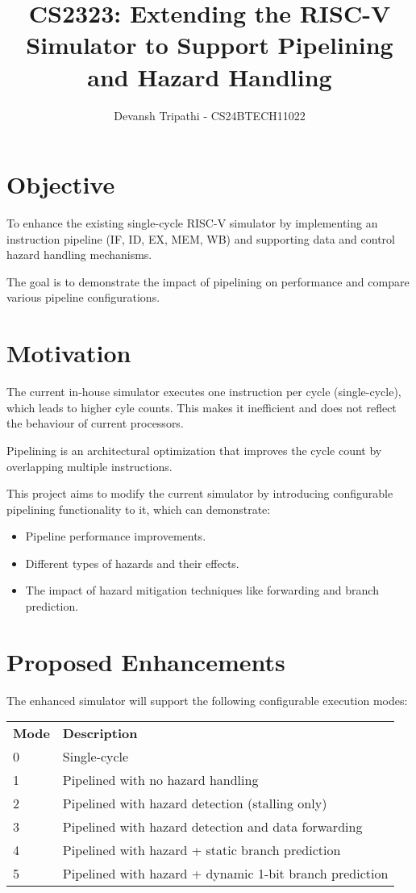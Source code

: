 \documentclass{report}
\author{Devansh Tripathi - CS24BTECH11022}
\title{CS2323: Extending the RISC-V Simulator to Support Pipelining and Hazard Handling}
\date{}
\begin{document}
\maketitle
\newpage
\tableofcontents
\newpage
\section{Objective}
To enhance the existing single-cycle RISC-V simulator by implementing an instruction pipeline (IF, ID, EX, MEM, WB) and supporting data and control hazard handling mechanisms.

The goal is to demonstrate the impact of pipelining on performance and compare various pipeline configurations.

\section{Motivation}
The current in-house simulator executes one instruction per cycle (single-cycle), which leads to higher cyle counts. This makes it inefficient and does not reflect the behaviour of current processors.

Pipelining is an architectural optimization that improves the cycle count by overlapping multiple instructions.

This project aims to modify the current simulator by introducing configurable pipelining functionality to it, which can demonstrate:
\begin{itemize}
    \item Pipeline performance improvements.
    \item Different types of hazards and their effects.
    \item The impact of hazard mitigation techniques like forwarding and branch prediction.
\end{itemize}

\section{Proposed Enhancements}
The enhanced simulator will support the following configurable execution modes:
\begin{table}[H]
\begin{tabular}{ll}
\textbf{Mode} & \textbf{Description}                                    \\
0             & Single-cycle                                            \\
1             & Pipelined with no hazard handling                       \\
2             & Pipelined with hazard detection (stalling only)         \\
3             & Pipelined with hazard detection and data forwarding     \\
4             & Pipelined with hazard + static branch prediction        \\
5             & Pipelined with hazard + dynamic 1-bit branch prediction
\end{tabular}
\end{table}
\end{document}
